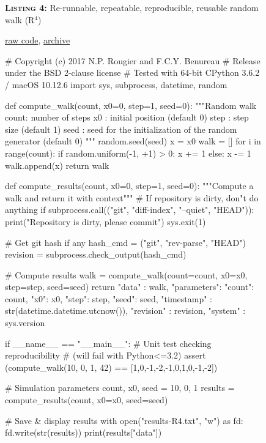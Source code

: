 \documentclass[a4paper,11pt]{article}
\begin{document}
\begin{figure}
\noindent \begin{minipage}[c]{\linewidth}
\begin{code}{\parbox{.8\textwidth}{\textbf{\textsc{Listing 4:}} Re-runnable, repeatable, reproducible, reusable random walk (R$^4$)}\parbox{.161\textwidth}{\hfill \href{https://raw.githubusercontent.com/rougier/random-walk/frontiers/random-walk-R4.py}{raw code}, \href{https://doi.org/10.5281/zenodo.848217}{archive}}}
# Copyright (c) 2017 N.P. Rougier and F.C.Y. Benureau
# Release under the BSD 2-clause license
# Tested with 64-bit CPython 3.6.2 / macOS 10.12.6
import sys, subprocess, datetime, random

def compute_walk(count, x0=0, step=1, seed=0):
    """Random walk
       count: number of steps
       x0   : initial position (default 0)
       step : step size (default 1)
       seed : seed for the initialization of the
	     random generator (default 0)
    """
    random.seed(seed)
    x = x0
    walk = []
    for i in range(count):
        if random.uniform(-1, +1) > 0:
            x += 1
        else:
            x -= 1
        walk.append(x)
    return walk

def compute_results(count, x0=0, step=1, seed=0):
    """Compute a walk and return it with context"""
    # If repository is dirty, don"t do anything
    if subprocess.call(("git", "diff-index",
                        "--quiet", "HEAD")):
        print("Repository is dirty, please commit")
        sys.exit(1)

    # Get git hash if any
    hash_cmd = ("git", "rev-parse", "HEAD")
    revision = subprocess.check_output(hash_cmd)

    # Compute results
    walk = compute_walk(count=count, x0=x0,
                        step=step, seed=seed)
    return {
        "data"      : walk,
        "parameters": {"count": count, "x0": x0,
                       "step": step, "seed": seed},
        "timestamp" : str(datetime.datetime.utcnow()),
        "revision"  : revision,
        "system"    : sys.version}

if __name__ == "__main__":
    # Unit test checking reproducibility
    # (will fail with Python<=3.2)
    assert (compute_walk(10, 0, 1, 42) ==
	        [1,0,-1,-2,-1,0,1,0,-1,-2])

    # Simulation parameters
    count, x0, seed = 10, 0, 1
    results = compute_results(count, x0=x0, seed=seed)

    # Save & display results
    with open("results-R4.txt", "w") as fd:
        fd.write(str(results))
    print(results["data"])
\end{code}
\end{minipage}\\
\end{figure}
\end{document}
